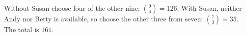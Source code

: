 Without Susan choose four of the other nine: $\binom94=126$. With Susan, neither Andy nor Betty is available, so choose the other three from seven: $\binom73=35$. The total is $\boxed{161}$.
